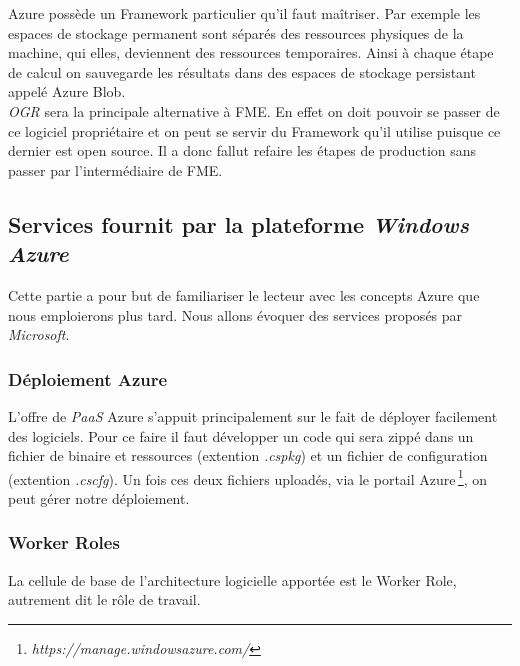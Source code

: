 Azure possède un Framework particulier qu'il faut maîtriser. Par
exemple les espaces de stockage permanent sont séparés des ressources
physiques de la machine, qui elles, deviennent des ressources
temporaires. Ainsi à chaque étape de calcul on sauvegarde les
résultats dans des espaces de stockage persistant appelé Azure Blob.\\

 \textit{OGR} sera la principale alternative à FME. En effet on doit
 pouvoir se passer de ce logiciel propriétaire et on peut se servir du
 Framework qu'il utilise puisque ce dernier est open source. Il a donc
 fallut refaire les étapes de production sans passer par
 l'intermédiaire de FME.\\






%
%



\subsection{Services fournit par la plateforme \textit{Windows Azure}}
Cette partie a pour but de familiariser le lecteur avec les concepts
Azure que nous emploierons plus tard. Nous allons évoquer des services
proposés par \textit{Microsoft}.\\


\subsubsection{Déploiement Azure}
L'offre de \textit{PaaS} Azure s'appuit principalement sur le fait de
déployer facilement des logiciels. Pour ce faire il faut développer un
code qui sera zippé dans un fichier de binaire et ressources
(extention \textit{.cspkg}) et un fichier de configuration (extention
\textit{.cscfg}). Un fois ces deux fichiers uploadés, via le portail
Azure\,\footnote{\textit{https://manage.windowsazure.com/}}, on peut
gérer notre déploiement. \\

\subsubsection{Worker Roles}
La cellule de base de l'architecture logicielle apportée est le Worker
Role, autrement dit le rôle de travail. \\

